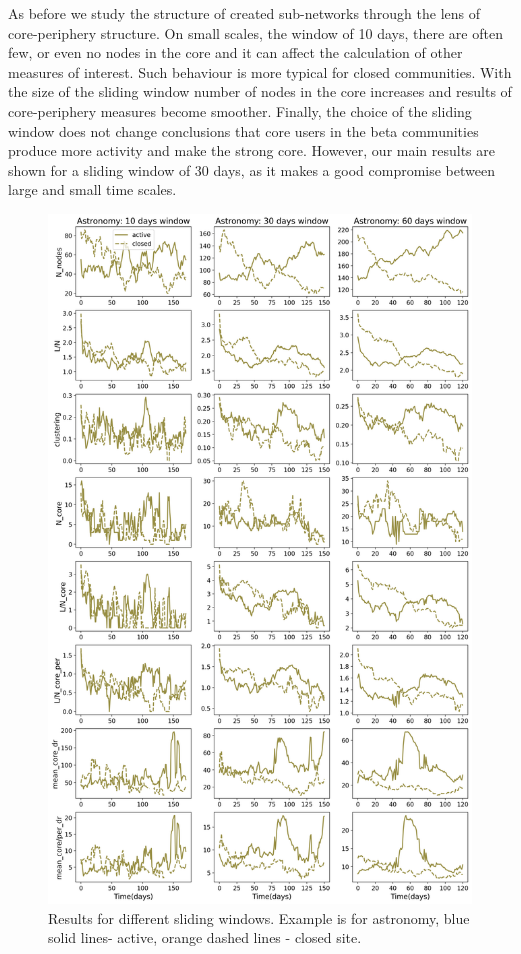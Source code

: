 As before we study the structure of created sub-networks through the lens of core-periphery structure. On small scales, the window of 10 days, there are often few, or even no nodes in the core and it can affect the calculation of other measures of interest. Such behaviour is more typical for closed communities.  With the size of the sliding window number of nodes in the core increases and results of core-periphery measures %
become smoother. Finally, the choice of the sliding window does not change conclusions that core users in the beta communities produce more activity and make the strong core. However, our main results are shown for a sliding window of 30 days, as it makes a good compromise between large and small time scales.  


\begin{figure}[h!]
	\centering
	\includegraphics[width=0.8\linewidth]{Figures/FigA14}
	\caption{Results for different sliding windows. Example is for astronomy, blue solid lines- active, orange dashed lines - closed site. }
	\label{fig:windows}
\end{figure}

